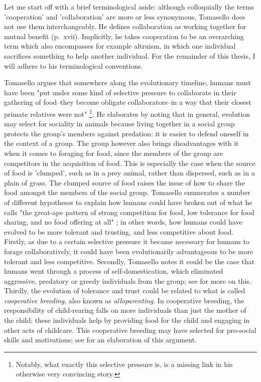 Let me start off with a brief terminological aside: although colloquially the terms 'cooperation' and 'collaboration' are more or less synonymous, Tomasello does not use them interchangeably. He defines collaboration as working together for mutual benefit (p.~xvii). Implicitly, he takes cooperation to be an overarching term which also encompasses for example altruism, in which one individual sacrifices something to help another individual. For the remainder of this thesis, I will adhere to his terminological conventions.

Tomasello argues that somewhere along the evolutionary timeline, humans must have been "put under some kind of selective pressure to collaborate in their gathering of food--they become obligate collaborators--in a way that their closest primate relatives were not" \citep[p.~75]{Tomasello09}\footnote{Notably, what exactly this selective pressure is, is a missing link in his otherwise very convincing story.}.
He elaborates by noting that in general, evolution may select for sociality in animals because living together in a social group protects the group's members against predation: it is easier to defend oneself in the context of a group. The group however also brings disadvantages with it when it comes to foraging for food, since the members of the group are competitors in the acquisition of food. This is especially the case when the source of food is 'clumped', such as in a prey animal, rather than dispersed, such as in a plain of grass. The clumped source of food raises the issue of how to share the food amongst the members of the social group.
Tomasello enumerates a number of different hypotheses to explain how humans could have broken out of what he calls "the great-ape pattern of strong competition for food, low tolerance for food sharing, and no food offering at all" \citep[p.~83]{Tomasello09}; in other words, how humans could have evolved to be more tolerant and trusting, and less competitive about food.
Firstly, as due to a certain selective pressure it became necessary for humans to forage collaboratively, it could have been evolutionarily advantageous to be more tolerant and less competitive.
Secondly, Tomasello notes it could be the case that humans went through a process of self-domestication, which eliminated aggressive, predatory or greedy individuals from the group; see \citet{Benitez21} for more on this.
Thirdly, the evolution of tolerance and trust could be related to what is called \emph{cooperative breeding}, also known as \emph{alloparenting}. In cooperative breeding, the responsibility of child-rearing falls on more individuals than just the mother of the child; these individuals help by providing food for the child and engaging in other acts of childcare. This cooperative breeding may have selected for pro-social skills and motivations; see \citet{Hrdy09} for an elaboration of this argument.

